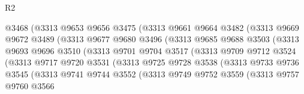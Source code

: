\begin{lexlean}{R2}
\begin{coremodule}
                          @3468
                          (@3313
                            @9653
                            @9656
                            @3475
                            (@3313
                              @9661
                              @9664
                              @3482
                              (@3313
                                @9669
                                @9672
                                @3489
                                (@3313
                                  @9677
                                  @9680
                                  @3496
                                  (@3313
                                    @9685
                                    @9688
                                    @3503
                                    (@3313
                                      @9693
                                      @9696
                                      @3510
                                      (@3313
                                        @9701
                                        @9704
                                        @3517
                                        (@3313
                                          @9709
                                          @9712
                                          @3524
                                          (@3313
                                            @9717
                                            @9720
                                            @3531
                                            (@3313
                                              @9725
                                              @9728
                                              @3538
                                              (@3313
                                                @9733
                                                @9736
                                                @3545
                                                (@3313
                                                  @9741
                                                  @9744
                                                  @3552
                                                  (@3313
                                                    @9749
                                                    @9752
                                                    @3559
                                                    (@3313
                                                      @9757
                                                      @9760
                                                      @3566

\end{coremodule}
\end{lexlean}
